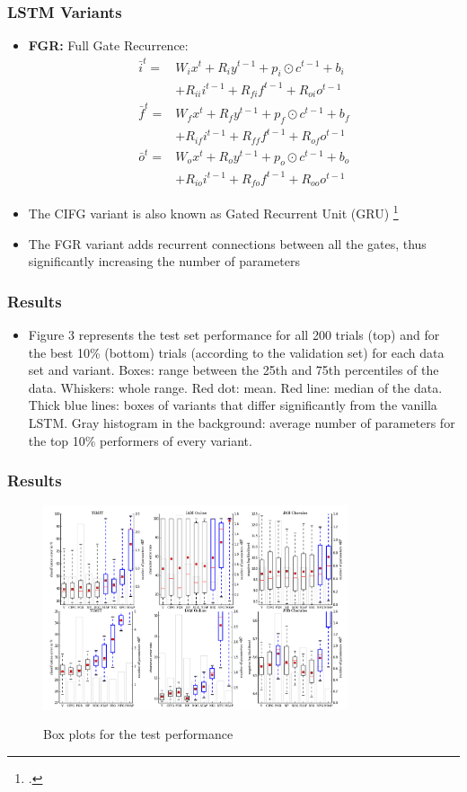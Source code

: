 \documentclass{beamer}
\begin{document}
\begin{frame}
\frametitle{LSTM Variants}
\begin{itemize}
	\item \textbf{FGR:} Full Gate Recurrence:
	\begin{align*}
		\bar{i}^t = &W_i x^t + R_i y^{t-1} + p_i \odot c^{t-1} + b_i \\
					&+ R_{ii} i^{t-1} + R_{fi} f^{t-1} + R_{oi} o^{t-1} \\
		\bar{f}^t = &W_f x^t + R_f y^{t-1} + p_f \odot c^{t-1} + b_f \\
					&+ R_{if} i^{t-1} + R_{ff} f^{t-1} + R_{of} o^{t-1} \\
		\bar{o}^t = &W_o x^t + R_o y^{t-1} + p_o \odot c^{t-1} + b_o \\
					&+ R_{io} i^{t-1} + R_{fo} f^{t-1} + R_{oo} o^{t-1}
	\end{align*}
	\item The CIFG variant is also known as Gated Recurrent Unit (GRU) \footcite{DBLP:journals/corr/ChoMGBSB14}
	\item The FGR variant adds recurrent connections between all the gates, thus significantly increasing the number of parameters
\end{itemize}
\end{frame}

\begin{frame}
\frametitle{Results}
\begin{itemize}
	\item Figure 3 represents the test set performance for all 200 trials (top) and for the best 10\% (bottom) trials (according to the validation set) for each data set and variant.
Boxes: range between the 25th and 75th percentiles of the data. Whiskers: whole range. Red dot: mean. Red line: median of the data. Thick blue lines: boxes
of variants that differ significantly from the vanilla LSTM. Gray histogram in the background: average number of parameters for the top 10\% performers of
every variant.
\end{itemize}
\end{frame}

\begin{frame}
\frametitle{Results}
\begin{figure}
        {\includegraphics[width=0.8\textwidth]{results.png}}
        \caption{Box plots for the test performance}
    \end{figure}
\end{frame}
\end{document}
